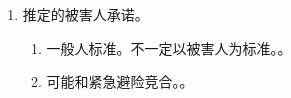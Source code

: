 \begin{enumerate}
\begin{enumerate}
                \begin{kk}{受欺骗产生认识错误}
                  \begin{enumerate}
                    \item {}。即。。
                    \item 动机性欺骗。动机错误不影响被害人承诺有效性。包括卑劣的动机，不要带入道德审判。
                          \begin{enumerate}
                            \item {}。
                            \item {}。
                          \end{enumerate}
                  \end{enumerate}
                \end{kk}
        \end{enumerate}
  \item 推定的被害人承诺。
        \begin{enumerate}
          \item 一般人标准。不一定以被害人为标准。。
          \item 可能和紧急避险竞合。。
        \end{enumerate}
\end{enumerate}
% 
